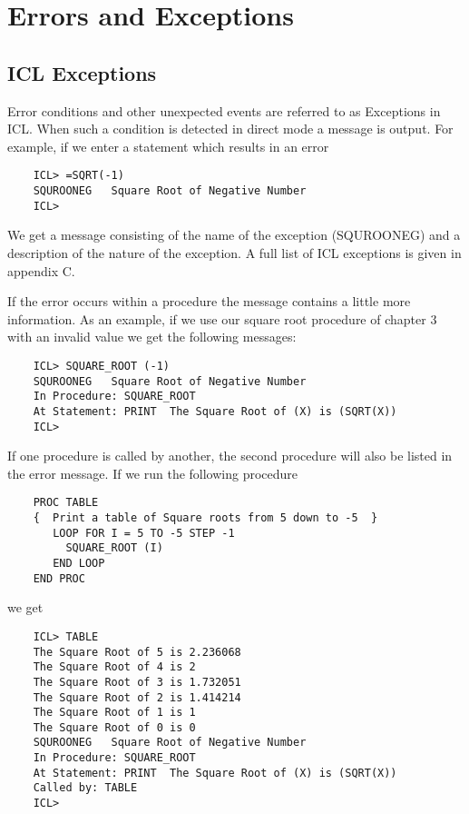\documentclass[twoside,11pt]{report}
\newcommand{\xlabel}[1]{}
\begin{document}
\chapter{\xlabel{errors_and_exceptions}Errors and Exceptions}

\section{\xlabel{icl_exceptions}ICL Exceptions}

Error conditions and other unexpected events are referred to as Exceptions
in ICL. When such a condition is detected in direct mode a message is
output. For example, if we enter a statement which results in an error
\begin{verbatim}
    ICL> =SQRT(-1)
    SQUROONEG   Square Root of Negative Number
    ICL>
\end{verbatim}

We get a message consisting of the name of the exception (SQUROONEG) and
a description of the nature of the exception. A full list of ICL
exceptions is given in appendix C.

If the error occurs within a procedure the message contains a little
more information. As an example, if we use our square root procedure of
chapter 3 with an invalid value we get the following messages:
\begin{verbatim}
    ICL> SQUARE_ROOT (-1)
    SQUROONEG   Square Root of Negative Number
    In Procedure: SQUARE_ROOT
    At Statement: PRINT  The Square Root of (X) is (SQRT(X))
    ICL>
\end{verbatim}

If one procedure is called by another, the second procedure will also
be listed in the error message. If we run the following procedure

\begin{verbatim}
    PROC TABLE
    {  Print a table of Square roots from 5 down to -5  }
       LOOP FOR I = 5 TO -5 STEP -1
         SQUARE_ROOT (I)
       END LOOP
    END PROC
\end{verbatim}

we get

\begin{verbatim}
    ICL> TABLE
    The Square Root of 5 is 2.236068
    The Square Root of 4 is 2
    The Square Root of 3 is 1.732051
    The Square Root of 2 is 1.414214
    The Square Root of 1 is 1
    The Square Root of 0 is 0
    SQUROONEG   Square Root of Negative Number
    In Procedure: SQUARE_ROOT
    At Statement: PRINT  The Square Root of (X) is (SQRT(X))
    Called by: TABLE
    ICL>
\end{verbatim}
\end{document}
